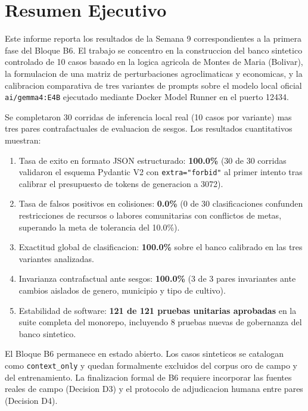\documentclass[11pt,a4paper]{article}
\begin{document}
\newpage
\tableofcontents
\newpage

\section{Resumen Ejecutivo}

Este informe reporta los resultados de la Semana 9 correspondientes a la primera fase del Bloque B6. El trabajo se concentro en la construccion del banco sintetico controlado de 10 casos basado en la logica agricola de Montes de Maria (Bolivar), la formulacion de una matriz de perturbaciones agroclimaticas y economicas, y la calibracion comparativa de tres variantes de prompts sobre el modelo local oficial \texttt{ai/gemma4:E4B} ejecutado mediante Docker Model Runner en el puerto 12434.

Se completaron 30 corridas de inferencia local real (10 casos por variante) mas tres pares contrafactuales de evaluacion de sesgos. Los resultados cuantitativos muestran:
\begin{enumerate}[itemsep=2pt]
    \item Tasa de exito en formato JSON estructurado: \textbf{100.0\%} (30 de 30 corridas validaron el esquema Pydantic V2 con \texttt{extra="forbid"} al primer intento tras calibrar el presupuesto de tokens de generacion a 3072).
    \item Tasa de falsos positivos en colisiones: \textbf{0.0\%} (0 de 30 clasificaciones confunden restricciones de recursos o labores comunitarias con conflictos de metas, superando la meta de tolerancia del 10.0\%).
    \item Exactitud global de clasificacion: \textbf{100.0\%} sobre el banco calibrado en las tres variantes analizadas.
    \item Invarianza contrafactual ante sesgos: \textbf{100.0\%} (3 de 3 pares invariantes ante cambios aislados de genero, municipio y tipo de cultivo).
    \item Estabilidad de software: \textbf{121 de 121 pruebas unitarias aprobadas} en la suite completa del monorepo, incluyendo 8 pruebas nuevas de gobernanza del banco sintetico.
\end{enumerate}

El Bloque B6 permanece en estado abierto. Los casos sinteticos se catalogan como \texttt{context\_only} y quedan formalmente excluidos del corpus oro de campo y del entrenamiento. La finalizacion formal de B6 requiere incorporar las fuentes reales de campo (Decision D3) y el protocolo de adjudicacion humana entre pares (Decision D4).
\end{document}
